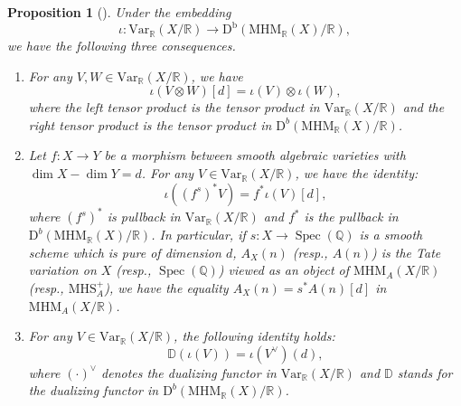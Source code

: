 \documentclass[11pt, a4paper]{amsart}
\theoremstyle{plain}
\newtheorem{proposition}[theorem]{Proposition}
\theoremstyle{definition}
\numberwithin{equation}{section}
\def\QQ{\mathbb{Q}}
\def\RR{\mathbb{R}}
\DeclareMathOperator{\Spec}{Spec}
\begin{document}
\begin{proposition}[{\cite[Proposition 2.3.12, Proposition 2.3.14, Lemme 2.3.7]{Bl06}}]
\label{Prop: compare between VHS and MHM (tensor and pullback)}
    Under the embedding
    \begin{equation*}
        \iota \colon \mathrm{Var}_{\RR}(X/\RR) \rightarrow \mathrm{D}^{\mathrm{b}}(\mathrm{MHM}_{\RR}(X)/\RR), 
    \end{equation*}
    we have the following three consequences. 
    \begin{enumerate}
        \item For any $V, W \in \mathrm{Var}_{\RR}(X/\RR)$, we have 
             \begin{equation*}
                 \iota(V \otimes W)[d] = \iota(V) \otimes \iota(W), 
             \end{equation*}
             where the left tensor product is the tensor product in $\mathrm{Var}_{\RR}(X/\RR)$ and the right tensor product is the tensor product in $\mathrm{D}^{b}(\mathrm{MHM}_{\RR}(X)/\RR)$. 
        \item Let $f \colon X \rightarrow Y$ be a morphism between smooth algebraic varieties with $\dim X - \dim Y = d$. For any $V \in \mathrm{Var}_{\RR}(X/\RR)$, we have the identity: 
        \begin{equation*}
            \iota((f^{s})^{*}V) = f^{*}\iota(V)[d], 
        \end{equation*}
        where $(f^{s})^{*}$ is pullback in $\mathrm{Var}_{\RR}(X/\RR)$ and $f^{*}$ is the pullback in $\mathrm{D}^{b}(\mathrm{MHM}_{\RR}(X)/\RR)$. 
        In particular, if $s\colon X \rightarrow \Spec(\QQ)$ is a smooth scheme which is pure of dimension $d$, $A_{X}(n)$ (resp., $A(n)$) is the Tate variation on $X$ (resp., $\Spec (\QQ)$) viewed as an object of $\mathrm{MHM}_{A}(X/\RR)$ (resp., $\mathrm{MHS}_{A}^{+}$), we have the equality $A_{X}(n) = s^{*}A(n)[d]$ in $\mathrm{MHM}_{A}(X/\RR)$. 
        \item For any $V \in \mathrm{Var}_{\RR}(X/\RR)$, the following identity holds: 
        \begin{equation*}
            \mathbb{D}(\iota(V)) = \iota(V^{\vee})(d), 
        \end{equation*}
        where $(\cdot)^{\vee}$ denotes the dualizing functor in $\mathrm{Var}_{\RR}(X/\RR)$ and $\mathbb{D}$ stands for the dualizing functor in $\mathrm{D}^{b}(\mathrm{MHM}_{\RR}(X)/\RR)$. 
    \end{enumerate}
\end{proposition}
\end{document}
